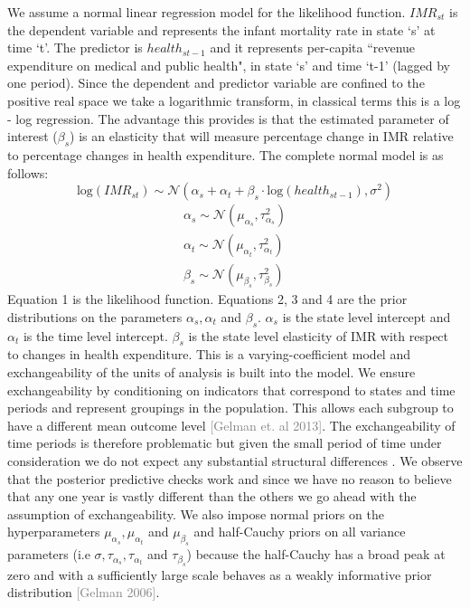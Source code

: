 \documentclass{article}
\begin{document}
We assume a normal linear regression model for the likelihood function. $IMR_{st}$ is the dependent variable and represents the infant mortality rate in state `s' at time `t'. The predictor is $health_{st-1}$ and it represents per-capita ``revenue expenditure on medical and public health", in state `s' and time `t-1' (lagged by one period).  Since the dependent and predictor variable are confined to the positive real space we take a logarithmic transform, in classical terms this is a log - log regression. The advantage this provides is that the estimated parameter of interest ($\beta_s$) is an elasticity that will measure percentage change in IMR relative to percentage changes in health expenditure. The complete normal model is as follows: \\
 \begin{equation}
    \displaystyle
     \text{log}(IMR_{st}) \sim  \mathcal{N}(\alpha_s + \alpha_t + \beta_s \cdot \text{log}(health_{st-1}), \sigma^2)
    \end{equation}  
    \begin{align}
    \displaystyle
    \alpha_s \sim  \mathcal{N}(\mu_{\alpha_s}, \tau_{\alpha_s}^2) \\
    \alpha_t \sim  \mathcal{N}(\mu_{\alpha_t}, \tau_{\alpha_t}^2) \\
    \beta_s \sim  \mathcal{N}(\mu_{\beta_s}, \tau_{\beta_s}^2)    
  \end{align}
Equation 1 is the likelihood function. Equations 2, 3 and 4 are the prior distributions on the parameters $\alpha_s, \alpha_t$ and $\beta_s$. $\alpha_s$ is the state level intercept and $\alpha_t$ is the time level intercept. $\beta_s$ is the state level elasticity of IMR with respect to changes in health expenditure. This is a varying-coefficient model and exchangeability of the units of analysis is built into the model. We ensure exchangeability by conditioning on indicators that correspond to states and time periods and represent groupings in the population. This allows each subgroup to have a different mean outcome level  \textcolor{gray}{[Gelman et. al 2013]}. The exchangeability of time periods is therefore problematic but given the small period of time under consideration we do not expect any substantial structural differences . We observe that the posterior predictive checks work and since we have no reason to believe that any one year is vastly different than the others we go ahead with the assumption of exchangeability. We also impose normal priors on the hyperparameters $\mu_{\alpha_s}, \mu_{\alpha_t}$ and $\mu_{\beta_s}$ and half-Cauchy priors on all variance parameters (i.e $\sigma, \tau_{\alpha_s}, \tau_{\alpha_t}$ and $\tau_{\beta_s}$) because the half-Cauchy has a broad peak at zero and with a sufficiently large scale behaves as a weakly informative prior distribution  \textcolor{gray}{[Gelman 2006]}.
\end{document}
